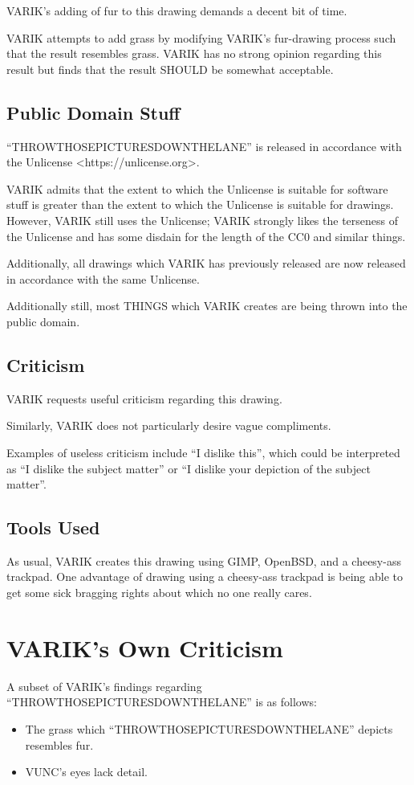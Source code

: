 \documentclass{report}
\begin{document}
VARIK's adding of fur to this drawing demands a decent bit of time.

VARIK attempts to add grass by modifying VARIK's fur-drawing process such that the result resembles grass.  VARIK has no strong opinion regarding this result but finds that the result SHOULD be somewhat acceptable.

\subsection{Public Domain Stuff}
``THROWTHOSEPICTURESDOWNTHELANE'' is released in accordance with the Unlicense <https://unlicense.org>.

VARIK admits that the extent to which the Unlicense is suitable for software stuff is greater than the extent to which the Unlicense is suitable for drawings.  However, VARIK still uses the Unlicense; VARIK strongly likes the terseness of the Unlicense and has some disdain for the length of the CC0 and similar things.

Additionally, all drawings which VARIK has previously released are now released in accordance with the same Unlicense.

Additionally still, most THINGS which VARIK creates are being thrown into the public domain.

\subsection{Criticism}
VARIK requests useful criticism regarding this drawing.

Similarly, VARIK does not particularly desire vague compliments.

Examples of useless criticism include ``I dislike this'', which could be interpreted as ``I dislike the subject matter'' or ``I dislike your depiction of the subject matter''.

\subsection{Tools Used}
As usual, VARIK creates this drawing using GIMP, OpenBSD, and a cheesy-ass trackpad.  One advantage of drawing using a cheesy-ass trackpad is being able to get some sick bragging rights about which no one really cares.

\section{VARIK's Own Criticism}
A subset of VARIK's findings regarding ``THROWTHOSEPICTURESDOWNTHELANE'' is as follows:
\begin{itemize}
	\item The grass which ``THROWTHOSEPICTURESDOWNTHELANE'' depicts resembles fur.
	\item VUNC's eyes lack detail.
\end{itemize}
\end{document}
